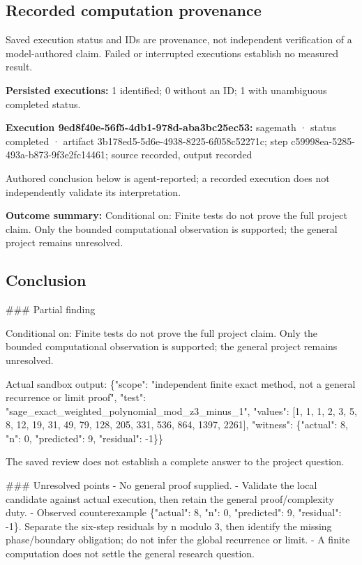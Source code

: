 \documentclass[11pt]{article}
\begin{document}
\subsection{Recorded computation provenance}
Saved execution status and IDs are provenance, not independent verification of a model-authored claim. Failed or interrupted executions establish no measured result.\par
\textbf{Persisted executions:} 1 identified; 0 without an ID; 1 with unambiguous completed status.\par
\textbf{Execution 9ed8f40e-56f5-4db1-978d-aba3bc25ec53:} sagemath · status completed · artifact 3b178ed5-5d6e-4938-8225-6f058c52271c; step c59998ea-5285-493a-b873-9f3e2fc14461; source recorded, output recorded\par
Authored conclusion below is agent-reported; a recorded execution does not independently validate its interpretation.\par
\textbf{Outcome summary:} Conditional on: Finite tests do not prove the full project claim. Only the bounded computational observation is supported; the general project remains unresolved.\par
\subsection{Conclusion}
\#\#\# Partial finding

Conditional on: Finite tests do not prove the full project claim. Only the bounded computational observation is supported; the general project remains unresolved.

Actual sandbox output: \{"scope": "independent finite exact method, not a general recurrence or limit proof", "test": "sage\_exact\_weighted\_polynomial\_mod\_z3\_minus\_1", "values": [1, 1, 1, 2, 3, 5, 8, 12, 19, 31, 49, 79, 128, 205, 331, 536, 864, 1397, 2261], "witness": \{"actual": 8, "n": 0, "predicted": 9, "residual": -1\}\}

The saved review does not establish a complete answer to the project question.

\#\#\# Unresolved points
- No general proof supplied.
- Validate the local candidate against actual execution, then retain the general proof/complexity duty.
- Observed counterexample \{"actual": 8, "n": 0, "predicted": 9, "residual": -1\}. Separate the six-step residuals by n modulo 3, then identify the missing phase/boundary obligation; do not infer the global recurrence or limit.
- A finite computation does not settle the general research question.
\end{document}
